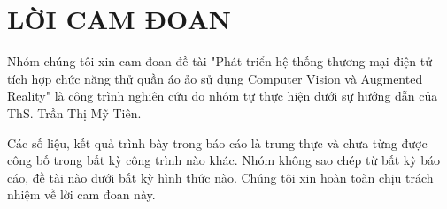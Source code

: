 
\chapter*{LỜI CAM ĐOAN}

Nhóm chúng tôi xin cam đoan đề tài "Phát triển hệ thống thương mại điện tử tích hợp chức năng thử quần áo ảo sử dụng Computer Vision và Augmented Reality"  là công trình nghiên cứu do nhóm tự thực hiện dưới sự hướng dẫn của ThS. Trần Thị Mỹ Tiên.

Các số liệu, kết quả trình bày trong báo cáo là trung thực và chưa từng được công bố trong bất kỳ công trình nào khác. Nhóm không sao chép từ bất kỳ báo cáo, đề tài nào dưới bất kỳ hình thức nào. Chúng tôi xin hoàn toàn chịu trách nhiệm về lời cam đoan này.

\clearpage